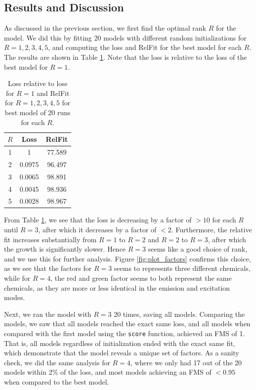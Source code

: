 \subsection*{Results and Discussion}
As discussed in the previous section, we first find the optimal rank $R$ for the model.
We did this by fitting 20 models with different random initializations for $R = 1,2,3,4,5$, and computing the loss and RelFit for the best model for each $R$.
The results are shown in Table \ref{tab:rank_choice}.
Note that the loss is relative to the loss of the best model for $R=1$.

\begin{table}[H]
    \centering
    \begin{tabular}{|c|c|c|}
    \hline
    $R$ & Loss & RelFit \\
    \hline
    1 & 1 & 77.589 \\
    \hline
    2 & 0.0975 & 96.497 \\
    \hline
    3 & 0.0065 & 98.891 \\
    \hline
    4 & 0.0045 & 98.936 \\
    \hline
    5 & 0.0028 & 98.967 \\
    \hline
    \end{tabular}
    \caption{Loss relative to loss for $R=1$ and RelFit for $R=1,2,3,4,5$ for best model of 20 runs for each $R$.}
    \label{tab:rank_choice}
\end{table}

From Table \ref{tab:rank_choice}, we see that the loss is decreasing by a factor of $> 10$ for each $R$ until $R=3$, after which it decreases by a factor of $< 2$.
Furthermore, the relative fit increases substantially from $R=1$ to $R=2$ and $R=2$ to $R=3$, after which the growth is significantly slower.
Hence $R=3$ seems like a good choice of rank, and we use this for further analysis.
Figure \ref{fig:plot_factors} confirms this choice, as we see that the factors for $R=3$ seems to represents three different chemicals, while for $R=4$, the red and green factor seems to both represent the same chemicals, as they are more or less identical in the emission and excitation modes.

Next, we ran the model with $R = 3$ 20 times, saving all models.
Comparing the models, we saw that all models reached the exact same loss, and all models when compared with the first model using the \texttt{score} function, achieved an FMS of 1.
That is, all models regardless of initialization ended with the exact same fit, which demonstrate that the model reveals a unique set of factors.
As a sanity check, we did the same analysis for $R=4$, where we only had 17 out of the 20 models within 2\% of the loss, and most models achieving an FMS of $<0.95$ when compared to the best model.

